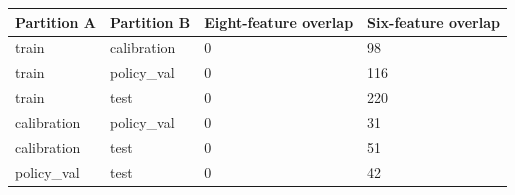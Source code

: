 \begin{tabular}{llll}
\toprule
Partition A & Partition B & Eight-feature overlap & Six-feature overlap \\
\midrule
train & calibration & 0 & 98 \\
train & policy\_val & 0 & 116 \\
train & test & 0 & 220 \\
calibration & policy\_val & 0 & 31 \\
calibration & test & 0 & 51 \\
policy\_val & test & 0 & 42 \\
\bottomrule
\end{tabular}